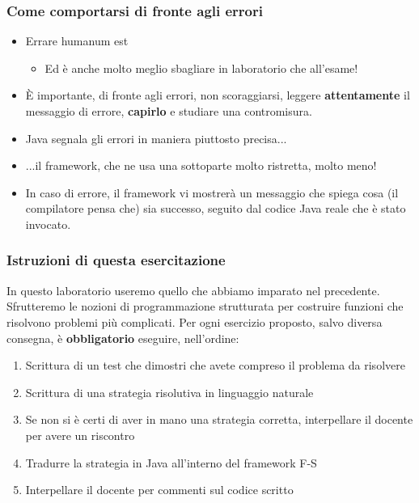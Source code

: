 \documentclass{beamer}
\begin{document}
\begin{frame}[fragile]
\frametitle{Come comportarsi di fronte agli errori}
\begin{itemize}
 \item Errare humanum est
  \begin{itemize}
    \item Ed è anche molto meglio sbagliare in laboratorio che all'esame!
  \end{itemize}
 \item È importante, di fronte agli errori, non scoraggiarsi, leggere \textbf{attentamente} il messaggio di errore, \textbf{capirlo} e studiare una contromisura.
 \item Java segnala gli errori in maniera piuttosto precisa...
 \item ...il framework, che ne usa una sottoparte molto ristretta, molto meno!
 \item In caso di errore, il framework vi mostrerà un messaggio che spiega cosa (il compilatore pensa che) sia successo, seguito dal codice Java reale che è stato invocato.
\end{itemize}
\end{frame}

\begin{frame}[fragile]
\frametitle{Istruzioni di questa esercitazione}
In questo laboratorio useremo quello che abbiamo imparato nel precedente. Sfrutteremo le nozioni di programmazione strutturata per costruire funzioni che risolvono problemi più complicati. Per ogni esercizio proposto, salvo diversa consegna, è \textbf{obbligatorio} eseguire, nell'ordine:
\begin{enumerate}
 \item Scrittura di un test che dimostri che avete compreso il problema da risolvere
 \item Scrittura di una strategia risolutiva in linguaggio naturale
 \item Se non si è certi di aver in mano una strategia corretta, interpellare il docente per avere un riscontro
 \item Tradurre la strategia in Java all'interno del framework F-S
 \item Interpellare il docente per commenti sul codice scritto
\end{enumerate}
\end{frame}
\end{document}
